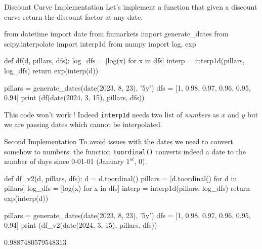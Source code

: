 \documentclass{beamer}
\begin{document}
\begin{frame}[fragile]{Discount Curve Implementation}
Let's implement a function that given a discount curve return the discount factor at any date.
\begin{ipython}
from datetime import date
from finmarkets import generate_dates
from scipy.interpolate import interp1d
from numpy import log, exp

def df(d, pillars, dfs):
    log_dfs = [log(x) for x in dfs]
    interp = interp1d(pillars, log_dfs)
    return exp(interp(d))
    
pillars = generate_dates(date(2023, 8, 23), '5y')
dfs = [1, 0.98, 0.97, 0.96, 0.95, 0.94]
print (df(date(2024, 3, 15), pillars, dfs))
\end{ipython}
This code won't work ! Indeed \texttt{interp1d} needs two list of \emph{numbers} as $x$ and $y$ but we are passing dates which cannot be interpolated.
\end{frame}

\begin{frame}[fragile]{Second Implementation}
To avoid issues with the dates we need to convert somehow to numbers: the function \texttt{toordinal()} converts indeed a date to the number of days since 0-01-01 (January $1^{st}$, 0).
\begin{ipython}
def df_v2(d, pillars, dfs):
    d = d.toordinal()
    pillars = [d.toordinal() for d in pillars]
    log_dfs = [log(x) for x in dfs]
    interp = interp1d(pillars, log_dfs)
    return exp(interp(d))
    
pillars = generate_dates(date(2023, 8, 23), '5y')
dfs = [1, 0.98, 0.97, 0.96, 0.95, 0.94]
print (df_v2(date(2024, 3, 15), pillars, dfs))
\end{ipython}
\begin{ioutput}
0.9887480579548313
\end{ioutput}
\end{frame}
\end{document}
